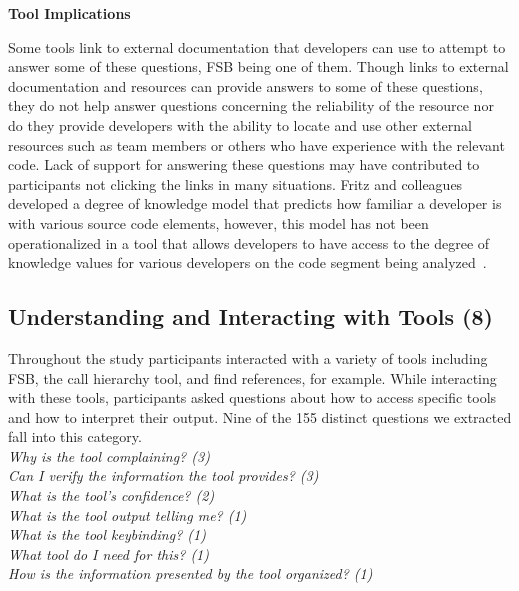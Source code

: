 \documentclass[conference]{IEEEtran}
\begin{document}
\noindent\textbf{Tool Implications}

Some tools link to external documentation that developers can use to attempt to answer some of these questions, FSB being one of them. 
Though links to external documentation and resources can provide answers to some of these questions, they do not help answer questions concerning the reliability of the resource nor do they provide developers with the ability to locate and use other external resources such as team members or others who have experience with the relevant code.
Lack of support for answering these questions may have contributed to participants not clicking the links in many situations.  
Fritz and colleagues developed a degree of knowledge model that predicts how familiar a developer is with various source code elements, however, this model has not been operationalized in a tool that allows developers to have access to the degree of knowledge values for various developers on the code segment being analyzed~\cite{fritz2010degree}.




\noindent\subsection{\textbf{Understanding and Interacting with Tools (8)}}\label{uit}

Throughout the study participants interacted with a variety of tools including FSB, the call hierarchy tool, and find references, for example. 
While interacting with these tools, participants asked questions about how to access specific tools and how to interpret their output. 
Nine of the 155 distinct questions we extracted fall into this category.
\\

\noindent\emph{Why is the tool complaining? (3)} \\
\emph{Can I verify the information the tool provides? (3)} \\
\emph{What is the tool's confidence? (2)} \\
\emph{What is the tool output telling me? (1)} \\
\emph{What is the tool keybinding? (1)} \\
\emph{What tool do I need for this? (1)} \\
\emph{How is the information presented by the tool organized? (1)} \\
\end{document}

